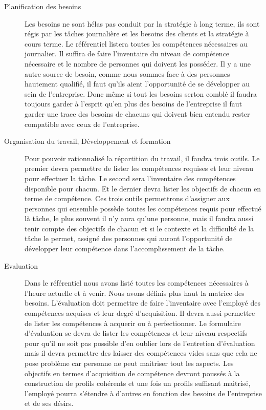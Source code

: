 \begin{description}
  \item[Planification des besoins] 
  Les besoins ne sont hélas pas conduit par la stratégie à long terme, ils sont régis par les tâches journalière et les besoins des clients et la stratégie à cours terme. Le référentiel listera toutes les compétences nécessaires au journalier. Il suffira de faire l'inventaire du niveau de compétence nécessaire et le nombre de personnes qui doivent les posséder. Il y a une autre source de besoin, comme nous sommes face à des personnes hautement qualifié, il faut qu'ils aient l'opportunité de se développer au sein de l'entreprise. Donc même si tout les besoins serton comblé il faudra toujours garder à l'esprit qu'en plus des besoins de l'entreprise il faut garder une trace des besoins de chacuns qui doivent bien entendu rester compatible avec ceux de l'entreprise. 

  \item[Organisation du travail, Développement et formation]
  Pour pouvoir rationnalisé la répartition du travail, il faudra trois outils. Le premier devra permettre de lister les compétences requises et leur niveau pour effectuer la tâche. Le second sera l'inventaire des compétences disponible pour chacun. Et le dernier devra lister les objectifs de chacun en terme de compétence. Ces trois outils permettrons d'assigner aux personnes qui ensemble possède toutes les compétences requis pour effectué là tâche, le plus souvent il n'y aura qu'une personne, mais il faudra aussi tenir compte des objectifs de chacun et si le contexte et la difficulté de la tâche le permet, assigné des personnes qui auront l'opportunité de développer leur compétence dans l'accomplissement de la tâche. %
  
  \item[Evaluation]
  Dans le référentiel nous avons listé toutes les compétences nécessaires à l'heure actuelle et à venir. Nous avons définis plus haut la matrice des besoins. L'évaluation doit permettre de faire l'inventaire avec l'employé des compétences acquises et leur degré d'acquisition. Il devra aussi permettre de lister les compétences à acquerir ou à perfectionner. Le formulaire d'évaluation se devra de lister les compétences et leur niveau respectifs pour qu'il ne soit pas possible d'en oublier lors de l'entretien d'évaluation mais il devra permettre des laisser des compétences vides sans que cela ne pose problème car personne ne peut maitriser tout les aspects. Les objectifs en termes d'acquisition de compétence devront poussés à la construction de profils cohérents et une fois un profils suffisant maitrisé, l'employé pourra s'étendre à d'autres en fonction des besoins de l'entreprise et de ses désirs. 


\end{description}
